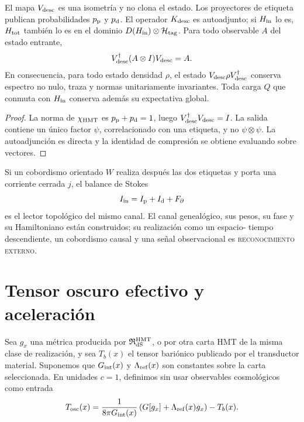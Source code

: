 \begin{theorem}
\label{thm:hmtf2-canal-descendiente}
El mapa \(V_{\rm desc}\) es una isometría y no clona el estado. Los
proyectores de etiqueta publican probabilidades \(p_{\rm p}\) y
\(p_{\rm d}\). El operador \(K_{\rm desc}\) es autoadjunto; si
\(H_{\rm in}\) lo es, \(H_{\rm tot}\) también lo es en el dominio
\(D(H_{\rm in})\otimes\mathcal H_{\rm tag}\). Para todo observable
\(A\) del estado entrante,
\[
 V_{\rm desc}^{\dagger}(A\otimes I)V_{\rm desc}=A.
\]
En consecuencia, para todo estado densidad \(\rho\), el estado
\(V_{\rm desc}\rho V_{\rm desc}^{\dagger}\) conserva espectro no nulo,
traza y normas unitariamente invariantes. Toda carga \(Q\) que conmuta con
\(H_{\rm in}\) conserva además su expectativa global.
\end{theorem}

\begin{proof}
La norma de \(\chi_{\rm HMT}\) es
\(p_{\rm p}+p_{\rm d}=1\), luego \(V_{\rm desc}^{\dagger}V_{\rm desc}=I\).
La salida contiene un único factor \(\psi\), correlacionado con una etiqueta,
y no \(\psi\otimes\psi\). La autoadjunción es directa y la identidad de
compresión se obtiene evaluando sobre vectores.
\end{proof}

Si un cobordismo orientado \(W\) realiza después las dos etiquetas y porta
una corriente cerrada \(j\), el balance de Stokes
\[
 I_{\rm in}=I_{\rm p}+I_{\rm d}+F_\partial
\]
es el lector topológico del mismo canal. El canal genealógico, sus pesos, su
fase y su Hamiltoniano están construidos; su realización como un espacio-
tiempo descendiente, un cobordismo causal y una señal observacional es
\textsc{reconocimiento externo}.

\section{Tensor oscuro efectivo y aceleración}
\label{sec:hmtf2-sector-oscuro}

Sea \(g_x\) una métrica producida por
\(\mathfrak R_{\rm dS}^{\rm HMT}\), o por otra carta HMT de la misma clase
de realización, y sea \(T_b(x)\) el tensor bariónico publicado por el
transductor material. Suponemos que \(G_{\rm int}(x)\) y
\(\Lambda_{\rm ref}(x)\) son constantes sobre la carta seleccionada. En
unidades \(c=1\), definimos sin usar observables cosmológicos como entrada
\[
 T_{\rm osc}(x)
 =\frac1{8\pi G_{\rm int}(x)}
 \left(G[g_x]+\Lambda_{\rm ref}(x)g_x\right)-T_b(x).
\]

